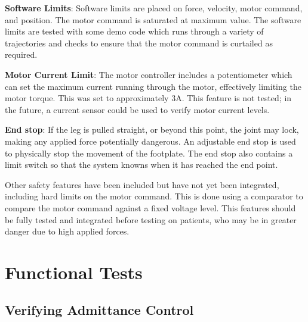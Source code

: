 \documentclass[12pt]{report}
\begin{document}
\textbf{Software Limits}: Software limits are placed on force, velocity, motor command, and position. The motor command is saturated at maximum value. The software limits are tested with some demo code which runs through a variety of trajectories and checks to ensure that the motor command is curtailed as required.

\textbf{Motor Current Limit}: The motor controller includes a potentiometer which can set the maximum current running through the motor, effectively limiting the motor torque. This was set to approximately 3A. This feature is not tested; in the future, a current sensor could be used to verify motor current levels.

\textbf{End stop}: If the leg is pulled straight, or beyond this point, the joint may lock, making any applied force potentially dangerous. An adjustable end stop is used to physically stop the movement of the footplate. The end stop also contains a limit switch so that the system knowns when it has reached the end point. 


Other safety features have been included but have not yet been integrated, including hard limits on the motor command. This is done using a comparator to compare the motor command against a fixed voltage level. This features should be fully tested and integrated before testing on patients, who may be in greater danger due to high applied forces. 

	
	\section{Functional Tests}


	\subsection{Verifying Admittance Control}
	
\end{document}

